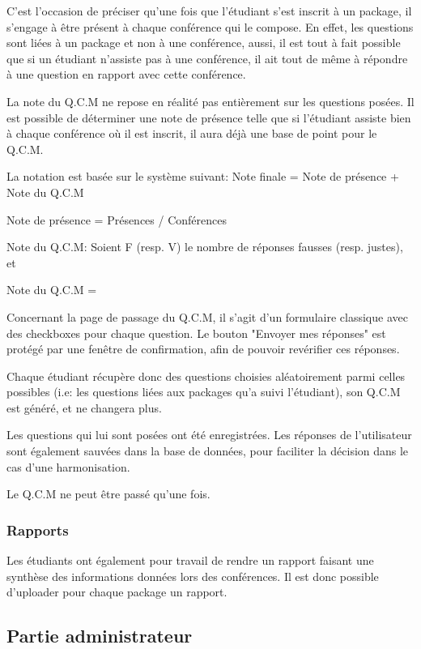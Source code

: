 C'est l'occasion de préciser qu'une fois que l'étudiant s'est inscrit à un package, il s'engage à être présent à chaque
conférence qui le compose. En effet, les questions sont liées à un package et non à une conférence, aussi, il est tout à fait
possible que si un étudiant n'assiste pas à une conférence, il ait tout de même à répondre à une question en rapport avec cette
conférence.

La note du Q.C.M ne repose en réalité pas entièrement sur les questions posées. Il est possible de déterminer une note de présence
telle que si l'étudiant assiste bien à chaque conférence où il est inscrit, il aura déjà une base de point pour le Q.C.M.

La notation est basée sur le système suivant:
Note finale = Note de présence + Note du Q.C.M

Note de présence = Présences / Conférences

Note du Q.C.M:
Soient F (resp. V) le nombre de réponses fausses (resp. justes), et 

Note du Q.C.M = 

Concernant la page de passage du Q.C.M, il s'agit d'un formulaire classique avec des checkboxes pour chaque question.
Le bouton "Envoyer mes réponses" est protégé par une fenêtre de confirmation, afin de pouvoir revérifier ces réponses.

Chaque étudiant récupère donc des questions choisies aléatoirement parmi celles possibles (i.e: les questions liées aux packages qu'a
suivi l'étudiant), son Q.C.M est généré, et ne changera plus.

Les questions qui lui sont posées ont été enregistrées. Les réponses de l'utilisateur sont également sauvées dans la base de données,
pour faciliter la décision dans le cas d'une harmonisation.

Le Q.C.M ne peut être passé qu'une fois.

            \subsubsection{Rapports}

Les étudiants ont également pour travail de rendre un rapport faisant une synthèse des informations données lors des conférences.
Il est donc possible d'uploader pour chaque package un rapport.

        \subsection{Partie administrateur}

